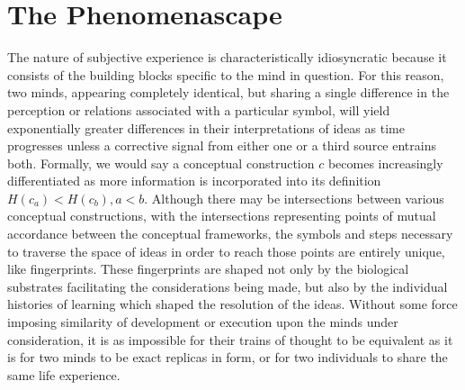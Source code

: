 \section{The Phenomenascape}

The nature of subjective experience is characteristically idiosyncratic because it consists of the building blocks specific to the mind in question. For this reason, two minds, appearing completely identical, but sharing a single difference in the perception or relations associated with a particular symbol, will yield exponentially greater differences in their interpretations of ideas as time progresses unless a corrective signal from either one or a third source entrains both. Formally, we would say a conceptual construction $c$ becomes increasingly differentiated as more information is incorporated into its definition $H(c_a) < H(c_b), a < b$. Although there may be intersections between various conceptual constructions, with the intersections representing points of mutual accordance between the conceptual frameworks, the symbols and steps necessary to traverse the space of ideas in order to reach those points are entirely unique, like fingerprints. These fingerprints are shaped not only by the biological substrates facilitating the considerations being made, but also by the individual histories of learning which shaped the resolution of the ideas. Without some force imposing similarity of development or execution upon the minds under consideration, it is as impossible for their trains of thought to be equivalent as it is for two minds to be exact replicas in form, or for two individuals to share the same life experience.

